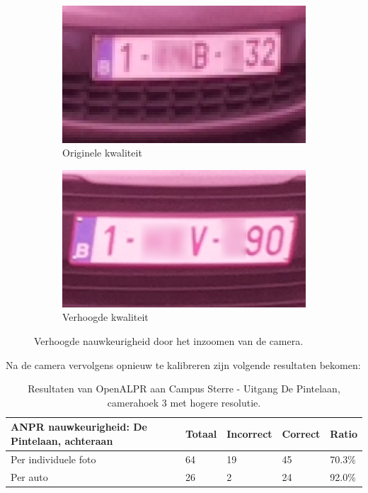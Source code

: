 \begin{figure}[h!]
	\centering
	\begin{subfigure}[b]{0.49\linewidth}
		\includegraphics[width=\linewidth]{img/sterachter/sterachter2.png}
		\caption{Originele kwaliteit}
	\end{subfigure}
	\begin{subfigure}[b]{0.49\linewidth}
		\includegraphics[width=\linewidth]{img/sterachter/hressmall2.png}
		\caption{Verhoogde kwaliteit}
	\end{subfigure}
	\caption{Verhoogde nauwkeurigheid door het inzoomen van de camera.}
	\label{fig:ressterrecomparison}
\end{figure}

Na de camera vervolgens opnieuw te kalibreren zijn volgende resultaten bekomen:
\begin{table}[h!]
	\centering
	\begin{tabular}{l|l|l|l|l}
		\textbf{ANPR nauwkeurigheid: De Pintelaan, achteraan} & Totaal & Incorrect & Correct & Ratio	\\ \hline
		Per individuele foto 	& 64 & 19	& 45	& 70.3\%\\
		Per auto				& 26 & 2	& 24 	& 92.0\%\\
	\end{tabular}
\caption{Resultaten van OpenALPR aan Campus Sterre - Uitgang De Pintelaan, camerahoek 3 met hogere resolutie.}
\label{tab:alprdepintelaan4}
\end{table}

